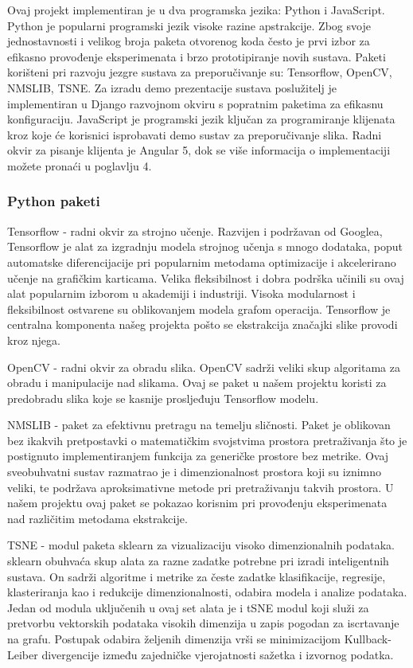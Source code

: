 \documentclass[times, utf8, proizvoljni, numeric]{fer}
\begin{document}
Ovaj projekt implementiran je u dva programska jezika: Python i JavaScript. 
Python je popularni programski jezik visoke razine apstrakcije. Zbog svoje jednostavnosti i velikog broja paketa otvorenog koda često je prvi izbor za efikasno provođenje eksperimenata i brzo prototipiranje novih sustava. Paketi korišteni pri razvoju jezgre sustava za preporučivanje su: Tensorflow, OpenCV, NMSLIB, TSNE. Za izradu demo prezentacije sustava poslužitelj je implementiran u Django razvojnom okviru s popratnim paketima za efikasnu konfiguraciju. 
JavaScript je programski jezik ključan za programiranje klijenata kroz koje će korisnici isprobavati demo sustav za preporučivanje slika. Radni okvir za pisanje klijenta je Angular 5, dok se više informacija o implementaciji možete pronaći u poglavlju 4.

\subsubsection{Python paketi }

Tensorflow \cite{tensorflow2015-whitepaper} - radni okvir za strojno učenje. Razvijen i podržavan od Googlea, Tensorflow je alat za izgradnju modela strojnog učenja s mnogo dodataka, poput automatske diferencijacije pri popularnim metodama optimizacije i akcelerirano učenje na grafičkim karticama. Velika fleksibilnost i dobra podrška učinili su ovaj alat popularnim izborom u akademiji i industriji. Visoka modularnost i fleksibilnost ostvarene su oblikovanjem modela grafom operacija.
Tensorflow je centralna komponenta našeg projekta pošto se ekstrakcija značajki slike provodi kroz njega.

OpenCV \cite{itseez2015opencv} - radni okvir za obradu slika. OpenCV sadrži veliki skup algoritama za obradu i manipulacije nad slikama. Ovaj se paket u našem projektu koristi za predobradu slika koje se kasnije prosljeđuju Tensorflow modelu.


NMSLIB \cite{NMSLIB} - paket za efektivnu pretragu na temelju sličnosti. Paket je oblikovan bez ikakvih pretpostavki o matematičkim svojstvima prostora pretraživanja što je postignuto implementiranjem funkcija za generičke prostore bez metrike. Ovaj sveobuhvatni sustav razmatrao je i dimenzionalnost prostora koji su iznimno veliki, te podržava aproksimativne metode pri pretraživanju takvih prostora. U našem projektu ovaj paket se pokazao korisnim pri provođenju eksperimenata nad različitim metodama ekstrakcije. 


TSNE \cite{TSNE} - modul paketa sklearn za vizualizaciju visoko dimenzionalnih podataka. sklearn obuhvaća skup alata za razne zadatke potrebne pri izradi inteligentnih sustava. On sadrži algoritme i metrike za česte zadatke klasifikacije, regresije, klasteriranja kao i redukcije dimenzionalnosti, odabira modela i analize podataka. Jedan od modula uključenih u ovaj set alata je i tSNE modul koji služi za pretvorbu vektorskih podataka visokih dimenzija u zapis pogodan za iscrtavanje na grafu. Postupak odabira željenih dimenzija vrši se minimizacijom Kullback-Leiber divergencije između zajedničke vjerojatnosti sažetka i izvornog podatka.
\end{document}
